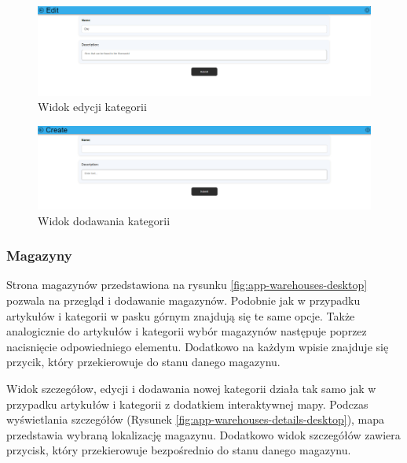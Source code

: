\documentclass[../main.tex]{subfiles}
\begin{document}
            \begin{figure}[H]
                \centering
                \includegraphics[width=\getImageWidth]{images/app-desktop/app-categories-edit-desktop.png}
                \caption{Widok edycji kategorii}
                \label{fig:app-categories-edit-desktop}
            \end{figure}

            \begin{figure}[H]
                \centering
                \includegraphics[width=\getImageWidth]{images/app-desktop/app-categories-add-desktop.png}
                \caption{Widok dodawania kategorii}
                \label{fig:app-categories-add-desktop}
            \end{figure}
        
        \FloatBarrier 
        \subsubsection{Magazyny}
            Strona magazynów przedstawiona na rysunku \ref{fig:app-warehouses-desktop} pozwala na przegląd i dodawanie magazynów. Podobnie jak w przypadku artykułów i kategorii w pasku górnym znajdują się te same opcje. Także analogicznie do artykułów i kategorii wybór magazynów następuje poprzez nacisnięcie odpowiedniego elementu. Dodatkowo na każdym wpisie znajduje się przycik, który przekierowuje do stanu danego magazynu.

            Widok szczegółow, edycji i dodawania nowej kategorii działa tak samo jak w przypadku artykułów i kategorii z dodatkiem interaktywnej mapy. Podczas wyświetlania szczegółów (Rysunek \ref{fig:app-warehouses-details-desktop}), mapa przedstawia wybraną lokalizację magazynu. Dodatkowo widok szczegółów zawiera przycisk, który przekierowuje bezpośrednio do stanu danego magazynu.
\end{document}
